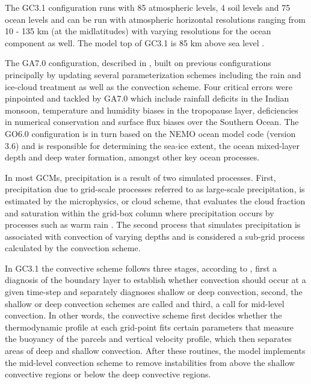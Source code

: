 The GC3.1 configuration runs with 85 atmospheric levels, 4 soil levels and 75 ocean levels and can be run with atmospheric horizontal resolutions ranging from 10 - 135 km (at the midlatitudes) with varying resolutions for the ocean component as well. The model top of GC3.1 is 85 km above sea level \citep{walters2019}. 

The GA7.0 configuration, described in \cite{walters2019}, built on previous configurations principally by updating several parameterization schemes including the rain and ice-cloud treatment as well as the convection scheme. Four critical errors were pinpointed and tackled by GA7.0 which include rainfall deficits in the Indian monsoon, temperature and humidity biases in the tropopause layer, deficiencies in numerical conservation and surface flux biases over the Southern Ocean. The GO6.0 configuration \citep{storkey2018} is in turn based on the NEMO ocean model code (version 3.6) and is responsible for determining the sea-ice extent, the ocean mixed-layer depth and deep water formation, amongst other key ocean processes.


In most GCMs, precipitation is a result of two simulated processes. First, precipitation due to grid-scale processes referred to as large-scale precipitation, is estimated by the microphysics, or cloud scheme, that evaluates the cloud fraction and saturation within the grid-box column where precipitation occurs by processes such as warm rain \citep{walters2019}. 
The second process that simulates precipitation is associated with convection of varying depths and is considered a sub-grid process calculated by the convection scheme. 

In GC3.1 the convective scheme follows three stages, according to \cite{walters2019}, first a diagnosis of the boundary layer to establish whether convection should occur at a given time-step and separately diagnoses shallow or deep convection, second, the shallow or deep convection schemes are called and third, a call for mid-level convection. 
In other words, the convective scheme first decides whether the thermodynamic profile at each grid-point fits certain parameters that measure the buoyancy of the parcels and vertical velocity profile, which then separates areas of deep and shallow convection. After these routines, the model implements the mid-level convection scheme to remove instabilities from above the shallow convective regions or below the deep convective regions. 

